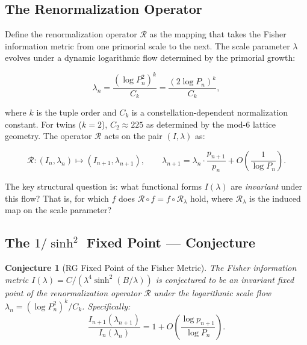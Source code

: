 \documentclass[11pt]{article}
\newtheorem{conjecture}[theorem]{Conjecture}
\theoremstyle{remark}
\begin{document}
\subsection{The Renormalization Operator}

Define the renormalization operator $\mathcal{R}$ as the mapping that
takes the Fisher information metric from one primorial scale to the next.
The scale parameter $\lambda$ evolves under a dynamic logarithmic flow
determined by the primorial growth:

\begin{equation}
\lambda_n = \frac{(\log P_n^2)^k}{C_k} = \frac{(2 \log P_n)^k}{C_k},
\label{eq:lambda-flow}
\end{equation}

where $k$ is the tuple order and $C_k$ is a constellation-dependent
normalization constant. For twins ($k=2$), $C_2 \approx 225$ as
determined by the mod-6 lattice geometry. The operator $\mathcal{R}$
acts on the pair $(I, \lambda)$ as:

\begin{equation}
\mathcal{R} : (I_n, \lambda_n) \mapsto (I_{n+1}, \lambda_{n+1}),
\qquad \lambda_{n+1} = \lambda_n \cdot \frac{p_{n+1}}{p_n} + O\left(\frac{1}{\log P_n}\right).
\end{equation}

The key structural question is: what functional forms $I(\lambda)$ are
\emph{invariant} under this flow? That is, for which $f$ does
$\mathcal{R} \circ f = f \circ \mathcal{R}_\lambda$ hold, where
$\mathcal{R}_\lambda$ is the induced map on the scale parameter?

\subsection{The $1/\sinh^2$ Fixed Point — Conjecture}

\begin{conjecture}[RG Fixed Point of the Fisher Metric]
\label{thm:rg-fixed-point}
The Fisher information metric $I(\lambda) = C/(\lambda^4 \sinh^2(B/\lambda))$
is conjectured to be an invariant fixed point of the renormalization
operator $\mathcal{R}$ under the logarithmic scale flow
$\lambda_n = (\log P_n^2)^k / C_k$. Specifically:
\begin{equation}
\frac{I_{n+1}(\lambda_{n+1})}{I_n(\lambda_n)} = 1 + O\!\left(\frac{\log p_{n+1}}{\log P_n}\right).
\end{equation}
\end{conjecture}
\end{document}
